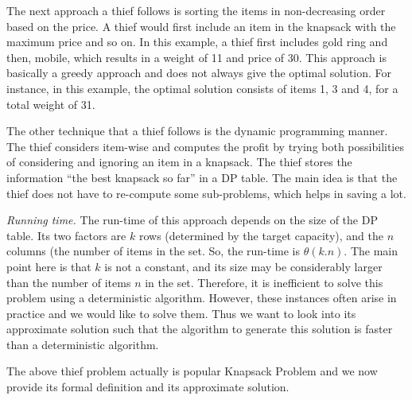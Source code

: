 The next approach a thief follows is sorting the items in non-decreasing order based on the price.
A thief would first include an item in the knapsack with the maximum price and so on.
In this example, a thief first includes gold ring and then, mobile, which results in a weight of 11 and price of 30.
This approach is basically a greedy approach and does not always give the optimal solution. 
For instance, in this example, the optimal solution consists of items 1, 3 and 4, for a total weight of 31.

The other technique that a thief follows is the dynamic programming manner. 
The thief considers item-wise and computes the profit by trying both possibilities of considering and ignoring an item in a knapsack.
The thief stores the information ``the best knapsack so far'' in a DP table.
The main idea is that the thief does not have to re-compute some sub-problems, which helps in saving a lot.


\textit{Running time.} The run-time of this approach depends on the size of the DP table. 
Its two factors are $k$ rows (determined by the target capacity), and the $n$ columns (the number of items in the set. So, the run-time is $\theta(k.n)$. 
The main point here is that $k$ is not a constant, and its size may be considerably larger than the number of items $n$ in the set. 
Therefore, it is inefficient to solve this problem using a deterministic algorithm.
However, these instances often arise in practice and we would like to solve them. 
Thus we want to look into its approximate solution such that the algorithm to generate this solution is faster than a deterministic algorithm.

The above thief problem actually is popular Knapsack Problem and we now provide its formal definition and its approximate solution.

